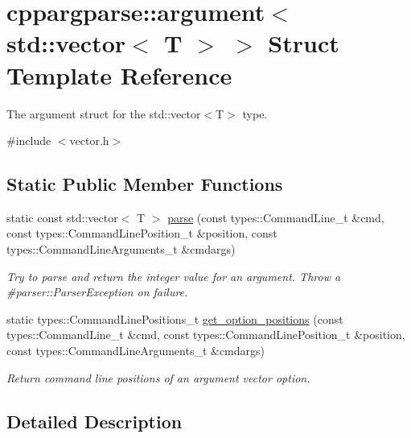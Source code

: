 \hypertarget{structcppargparse_1_1argument_3_01std_1_1vector_3_01T_01_4_01_4}{}\section{cppargparse\+:\+:argument$<$ std\+:\+:vector$<$ T $>$ $>$ Struct Template Reference}
\label{structcppargparse_1_1argument_3_01std_1_1vector_3_01T_01_4_01_4}


The argument struct for the std\+::vector$<$\+T$>$ type.  




{\ttfamily \#include $<$vector.\+h$>$}

\subsection*{Static Public Member Functions}
\begin{DoxyCompactItemize}
\item 
static const std\+::vector$<$ T $>$ \hyperlink{structcppargparse_1_1argument_3_01std_1_1vector_3_01T_01_4_01_4_ada258269ddf190ae8376a6bb807de588}{parse} (const types\+::\+Command\+Line\+\_\+t \&cmd, const types\+::\+Command\+Line\+Position\+\_\+t \&position, const types\+::\+Command\+Line\+Arguments\+\_\+t \&cmdargs)
\begin{DoxyCompactList}\small\item\em Try to parse and return the integer value for an argument. Throw a \#parser\+::\+Parser\+Exception on failure. \end{DoxyCompactList}\item 
static types\+::\+Command\+Line\+Positions\+\_\+t \hyperlink{structcppargparse_1_1argument_3_01std_1_1vector_3_01T_01_4_01_4_a57aaaece7f0d299010f47a9bbfbe5e70}{get\+\_\+option\+\_\+positions} (const types\+::\+Command\+Line\+\_\+t \&cmd, const types\+::\+Command\+Line\+Position\+\_\+t \&position, const types\+::\+Command\+Line\+Arguments\+\_\+t \&cmdargs)
\begin{DoxyCompactList}\small\item\em Return command line positions of an argument vector option. \end{DoxyCompactList}\end{DoxyCompactItemize}


\subsection{Detailed Description}
